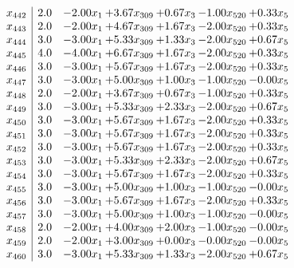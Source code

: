 \documentclass[8pt]{article}
\begin{document}
\[\begin{array}{c| c c@{\hskip 2pt} c@{\hskip 2pt} c@{\hskip 2pt} c@{\hskip 2pt} c@{\hskip 2pt} }
 x_{442}   &  2.0 & -2.00 x_{1} & +  3.67 x_{309} & +  0.67 x_{3} & -1.00 x_{520} & +  0.33 x_{5}\\
 x_{443}   &  2.0 & -2.00 x_{1} & +  4.67 x_{309} & +  1.67 x_{3} & -2.00 x_{520} & +  0.33 x_{5}\\
 x_{444}   &  3.0 & -3.00 x_{1} & +  5.33 x_{309} & +  1.33 x_{3} & -2.00 x_{520} & +  0.67 x_{5}\\
 x_{445}   &  4.0 & -4.00 x_{1} & +  6.67 x_{309} & +  1.67 x_{3} & -2.00 x_{520} & +  0.33 x_{5}\\
 x_{446}   &  3.0 & -3.00 x_{1} & +  5.67 x_{309} & +  1.67 x_{3} & -2.00 x_{520} & +  0.33 x_{5}\\
 x_{447}   &  3.0 & -3.00 x_{1} & +  5.00 x_{309} & +  1.00 x_{3} & -1.00 x_{520} & -0.00 x_{5}\\
 x_{448}   &  2.0 & -2.00 x_{1} & +  3.67 x_{309} & +  0.67 x_{3} & -1.00 x_{520} & +  0.33 x_{5}\\
 x_{449}   &  3.0 & -3.00 x_{1} & +  5.33 x_{309} & +  2.33 x_{3} & -2.00 x_{520} & +  0.67 x_{5}\\
 x_{450}   &  3.0 & -3.00 x_{1} & +  5.67 x_{309} & +  1.67 x_{3} & -2.00 x_{520} & +  0.33 x_{5}\\
 x_{451}   &  3.0 & -3.00 x_{1} & +  5.67 x_{309} & +  1.67 x_{3} & -2.00 x_{520} & +  0.33 x_{5}\\
 x_{452}   &  3.0 & -3.00 x_{1} & +  5.67 x_{309} & +  1.67 x_{3} & -2.00 x_{520} & +  0.33 x_{5}\\
 x_{453}   &  3.0 & -3.00 x_{1} & +  5.33 x_{309} & +  2.33 x_{3} & -2.00 x_{520} & +  0.67 x_{5}\\
 x_{454}   &  3.0 & -3.00 x_{1} & +  5.67 x_{309} & +  1.67 x_{3} & -2.00 x_{520} & +  0.33 x_{5}\\
 x_{455}   &  3.0 & -3.00 x_{1} & +  5.00 x_{309} & +  1.00 x_{3} & -1.00 x_{520} & -0.00 x_{5}\\
 x_{456}   &  3.0 & -3.00 x_{1} & +  5.67 x_{309} & +  1.67 x_{3} & -2.00 x_{520} & +  0.33 x_{5}\\
 x_{457}   &  3.0 & -3.00 x_{1} & +  5.00 x_{309} & +  1.00 x_{3} & -1.00 x_{520} & -0.00 x_{5}\\
 x_{458}   &  2.0 & -2.00 x_{1} & +  4.00 x_{309} & +  2.00 x_{3} & -1.00 x_{520} & -0.00 x_{5}\\
 x_{459}   &  2.0 & -2.00 x_{1} & +  3.00 x_{309} & +  0.00 x_{3} & -0.00 x_{520} & -0.00 x_{5}\\
 x_{460}   &  3.0 & -3.00 x_{1} & +  5.33 x_{309} & +  1.33 x_{3} & -2.00 x_{520} & +  0.67 x_{5}\\

\end{array}\]
\end{document}
